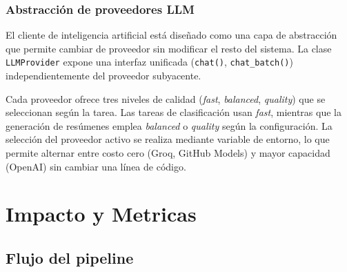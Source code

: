 \documentclass[12pt,oneside]{report}
\begin{document}
\subsection{Abstracci\'on de proveedores LLM}

El cliente de inteligencia artificial est\'a dise\~nado como una capa de abstracci\'on que permite cambiar de proveedor sin modificar el resto del sistema. La clase \texttt{LLMProvider} expone una interfaz unificada (\texttt{chat()}, \texttt{chat\_batch()}) independientemente del proveedor subyacente.

\begin{table}[H]
\centering
{}
\caption{Modelos disponibles por proveedor y nivel de calidad}
\end{table}

Cada proveedor ofrece tres niveles de calidad (\textit{fast}, \textit{balanced}, \textit{quality}) que se seleccionan seg\'un la tarea. Las tareas de clasificaci\'on usan \textit{fast}, mientras que la generaci\'on de res\'umenes emplea \textit{balanced} o \textit{quality} seg\'un la configuraci\'on. La selecci\'on del proveedor activo se realiza mediante variable de entorno, lo que permite alternar entre costo cero (Groq, GitHub Models) y mayor capacidad (OpenAI) sin cambiar una l\'inea de c\'odigo.

\chapter{Impacto y Metricas}

\section{Flujo del pipeline}
\end{document}
